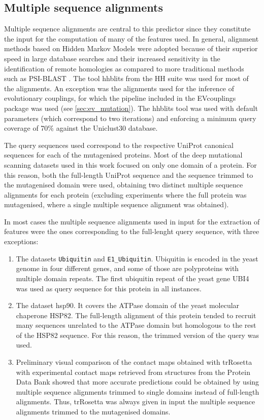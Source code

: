 \subsection{Multiple sequence alignments}\label{sec:msa}
Multiple sequence alignments are central to this predictor since they constitute the input for the computation of many of the features used.
In general, alignment methods based on Hidden Markov Models were adopted because of their superior speed in large database searches and their increased sensitivity in the identification of remote homologies as compared to more traditional methods such as PSI-BLAST \parencite[see the introduction of][and references therein]{Steinegger2019}.
The tool hhblits from the HH suite was used for most of the alignments.
An exception was the alignments used for the inference of evolutionary couplings, for which the pipeline included in the EVcouplings package was used (see \autoref{sec:ev_mutation}).
The hhblits tool was used with default parameters (which correspond to two iterations) and enforcing a minimum query coverage of 70\% against the Uniclust30 database.

The query sequences used correspond to the respective UniProt canonical sequences for each of the mutagenised proteins.
Most of the deep mutational scanning datasets used in this work focused on only one domain of a protein.
For this reason, both the full-length UniProt sequence and the sequence trimmed to the mutagenised domain were used, obtaining two distinct multiple sequence alignments for each protein (excluding experiments where the full protein was mutagenised, where a single multiple sequence alignment was obtained).

In most cases the multiple sequence alignments used in input for the extraction of features were the ones corresponding to the full-lenght query sequence, with three exceptions:
\begin{enumerate}[label= (\roman*)]
	\item The datasets \texttt{Ubiquitin} and \texttt{E1\_Ubiquitin}.
	      Ubiquitin is encoded in the yeast genome in four different genes, and some of those are polyproteins with multiple domain repeats.
	      The first ubiquitin repeat of the yeast gene UBI4 was used as query sequence for this protein in all instances.\
	\item The dataset hsp90. It covers the ATPase domain of the yeast molecular chaperone HSP82.
	      The full-length alignment of this protein tended to recruit many sequences unrelated to the ATPase domain but homologous to the rest of the HSP82 sequence.
	      For this reason, the trimmed version of the query was used.\
	\item Preliminary visual comparison of the contact maps obtained with trRosetta with experimental contact maps retrieved from structures from the Protein Data Bank showed that more accurate predictions could be obtained by using multiple sequence alignments trimmed to single domains instead of full-length alignments.
	      Thus, trRosetta was always given in input the multiple sequence alignments trimmed to the mutagenised domains.
\end{enumerate}


